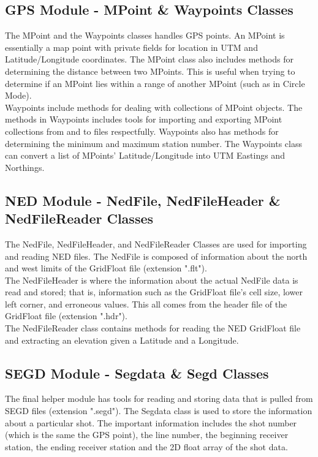 \documentclass[12pt]{article}
\begin{document}
\subsection{GPS Module - MPoint \& Waypoints Classes}

The MPoint and the Waypoints classes handles GPS points. An MPoint is essentially a map point with private fields for location in UTM and Latitude/Longitude coordinates. The MPoint class also includes methods for determining the distance between two MPoints. This is useful when trying to determine if an MPoint lies within a range of another MPoint (such as in Circle Mode). \\

Waypoints include methods for dealing with collections of MPoint objects. The methods in Waypoints includes tools for importing and exporting MPoint collections from and to files respectfully. Waypoints also has methods for determining the minimum and maximum station number. The Waypoints class can convert a list of MPoints' Latitude/Longitude into UTM Eastings and Northings. 

\subsection{NED Module - NedFile, NedFileHeader \& NedFileReader Classes}

The NedFile, NedFileHeader, and NedFileReader Classes are used for importing and reading NED files. The NedFile is composed of information about the north and west limits of the GridFloat file (extension ".flt"). \\

The NedFileHeader is where the information about the actual NedFile data is read and stored; that is, information such as the GridFloat file's cell size, lower left corner, and erroneous values. This all comes from the header file of the GridFloat file (extension ".hdr"). \\

The NedFileReader class contains methods for reading the NED GridFloat file and extracting an elevation given a Latitude and a Longitude. 

\subsection{SEGD Module - Segdata \& Segd Classes}

The final helper module has tools for reading and storing data that is pulled from SEGD files (extension ".segd"). The Segdata class is used to store the information about a particular shot. The important information includes the shot number (which is the same the GPS point), the line number, the beginning receiver station, the ending receiver station and the 2D float array of the shot data. \\ 
\end{document}
